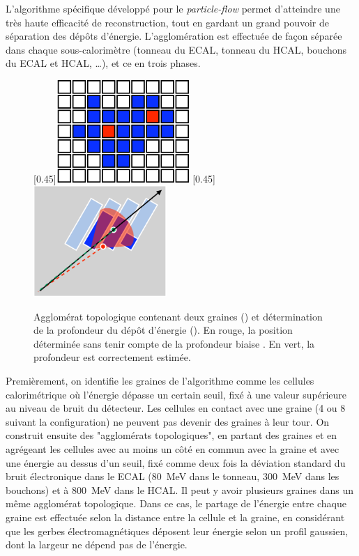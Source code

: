 L'algorithme spécifique développé pour le \emph{particle-flow} permet d'atteindre une très haute efficacité de reconstruction, tout en gardant un grand pouvoir de séparation des dépôts d'énergie. L'agglomération est effectuée de façon séparée dans chaque sous-calorimètre (tonneau du ECAL, tonneau du HCAL, bouchons du ECAL et HCAL, \ldots), et ce en trois phases.

\medskip

\begin{figure}
  \subcaptionbox{\label{fig:calo_topo}}[0.45\textwidth]{\includegraphics[width=0.45\textwidth]{chapitre3/figs/calo_topoclus_seeds.pdf}}\hfill
  \subcaptionbox{\label{fig:calo_depth}}[0.45\textwidth]{\includegraphics[width=0.45\textwidth]{chapitre3/figs/calo_depthcor.pdf}}
  \caption{Agglomérat topologique contenant deux graines () et détermination de la profondeur du dépôt d'énergie (). En rouge, la position déterminée sans tenir compte de la profondeur biaise \aeta. En vert, la profondeur est correctement estimée.}
\end{figure}

Premièrement, on identifie les graines de l'algorithme comme les cellules calorimétrique où l'énergie dépasse un certain seuil, fixé à une valeur supérieure au niveau de bruit du détecteur. Les cellules en contact avec une graine (4 ou 8 suivant la configuration) ne peuvent pas devenir des graines à leur tour. On construit ensuite des "agglomérats topologiques", en partant des graines et en agrégeant les cellules avec au moins un côté en commun avec la graine et avec une énergie au dessus d'un seuil, fixé comme deux fois la déviation standard du bruit électronique dans le ECAL (\SI{80}{\MeV} dans le tonneau, \tilde \SI{300}{\MeV} dans les bouchons) et à \SI{800}{\MeV} dans le HCAL. Il peut y avoir plusieurs graines dans un même agglomérat topologique. Dans ce cas, le partage de l'énergie entre chaque graine est effectuée selon la distance entre la cellule et la graine, en considérant que les gerbes électromagnétiques déposent leur énergie selon un profil gaussien, dont la largeur ne dépend pas de l'énergie.

